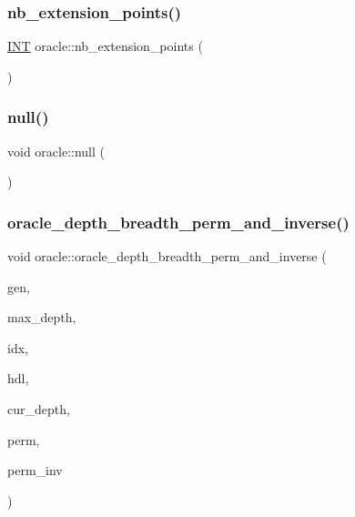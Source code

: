 \mbox{\label{classoracle_a1a19af59b8be86d6d41cb457ebd3c15b}} 
\subsubsection{\texorpdfstring{nb\+\_\+extension\+\_\+points()}{nb\_extension\_points()}}
{\footnotesize\ttfamily \mbox{\hyperlink{galois_8h_a09fddde158a3a20bd2dcadb609de11dc}{I\+NT}} oracle\+::nb\+\_\+extension\+\_\+points (\begin{DoxyParamCaption}{ }\end{DoxyParamCaption})}

\mbox{\label{classoracle_ae12c76830318ec2d4f6c2a77da98bb55}} 
\subsubsection{\texorpdfstring{null()}{null()}}
{\footnotesize\ttfamily void oracle\+::null (\begin{DoxyParamCaption}{ }\end{DoxyParamCaption})}

\mbox{\label{classoracle_aa8a32b267e874282452dc84bdb5eeb31}} 
\subsubsection{\texorpdfstring{oracle\+\_\+depth\+\_\+breadth\+\_\+perm\+\_\+and\+\_\+inverse()}{oracle\_depth\_breadth\_perm\_and\_inverse()}}
{\footnotesize\ttfamily void oracle\+::oracle\+\_\+depth\+\_\+breadth\+\_\+perm\+\_\+and\+\_\+inverse (\begin{DoxyParamCaption}\item[{\mbox{\hyperlink{classgenerator}{generator}} $\ast$}]{gen,  }\item[{\mbox{\hyperlink{galois_8h_a09fddde158a3a20bd2dcadb609de11dc}{I\+NT}}}]{max\+\_\+depth,  }\item[{\mbox{\hyperlink{galois_8h_a09fddde158a3a20bd2dcadb609de11dc}{I\+NT}} \&}]{idx,  }\item[{\mbox{\hyperlink{galois_8h_a09fddde158a3a20bd2dcadb609de11dc}{I\+NT}}}]{hdl,  }\item[{\mbox{\hyperlink{galois_8h_a09fddde158a3a20bd2dcadb609de11dc}{I\+NT}}}]{cur\+\_\+depth,  }\item[{\mbox{\hyperlink{galois_8h_a09fddde158a3a20bd2dcadb609de11dc}{I\+NT}} $\ast$}]{perm,  }\item[{\mbox{\hyperlink{galois_8h_a09fddde158a3a20bd2dcadb609de11dc}{I\+NT}} $\ast$}]{perm\+\_\+inv }\end{DoxyParamCaption})}

